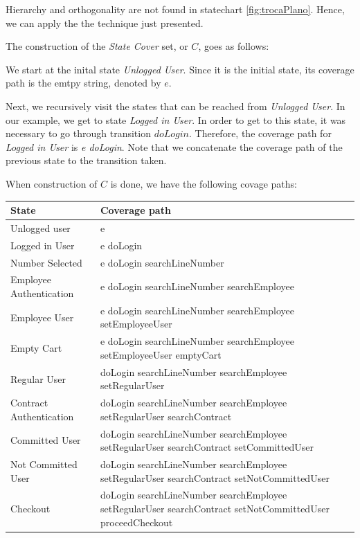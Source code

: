 Hierarchy and orthogonality are not found in statechart \ref{fig:trocaPlano}. Hence, we can apply the the technique just presented.

The construction of the \textit{State Cover} set, or $C$, goes as follows:

We start at the inital state \textit{Unlogged User}. Since it is the initial state, its coverage path is the emtpy string, denoted by $e$.

Next, we recursively visit the states that can be reached from \textit{Unlogged User}. In our example, we get to state \textit{Logged in User}. In order to get to this state, it was necessary to go through transition $doLogin$. Therefore, the coverage path for \textit{Logged in User} is \textit{e doLogin}. Note that we concatenate the coverage path of the previous state to the transition taken.

When construction of $C$ is done, we have the following covage paths:

\begin{center}
\begin{tabular}{| l | p{10cm}|}

\hline

State & Coverage path \\ \hline

Unlogged user & e \\ \hline

Logged in User & e doLogin\\ \hline 

Number Selected & e doLogin searchLineNumber\\ \hline

Employee Authentication & e doLogin searchLineNumber searchEmployee\\ \hline

Employee User & e doLogin searchLineNumber searchEmployee setEmployeeUser \\ \hline

Empty Cart & e doLogin searchLineNumber searchEmployee setEmployeeUser emptyCart \\ \hline

Regular User & doLogin searchLineNumber searchEmployee setRegularUser \\ \hline

Contract Authentication & doLogin searchLineNumber searchEmployee setRegularUser searchContract \\ \hline

Committed User & doLogin searchLineNumber searchEmployee setRegularUser searchContract setCommittedUser \\ \hline

Not Committed User & doLogin searchLineNumber searchEmployee setRegularUser searchContract setNotCommittedUser \\ \hline

Checkout & doLogin searchLineNumber searchEmployee setRegularUser searchContract setNotCommittedUser proceedCheckout\\
\hline
\end{tabular}
\end{center}


